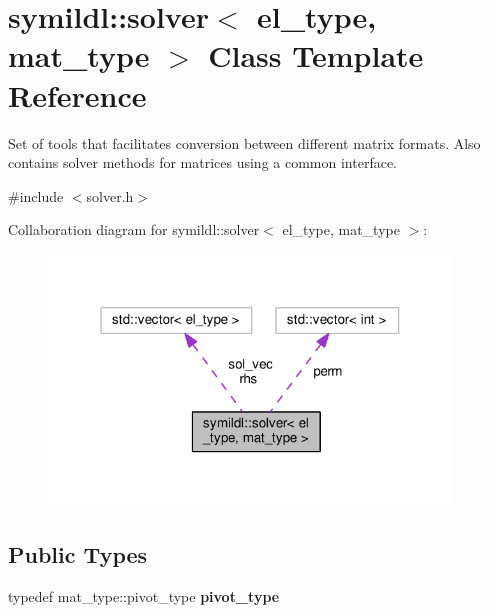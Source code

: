 \hypertarget{classsymildl_1_1solver}{}\section{symildl\+:\+:solver$<$ el\+\_\+type, mat\+\_\+type $>$ Class Template Reference}
\label{classsymildl_1_1solver}


Set of tools that facilitates conversion between different matrix formats. Also contains solver methods for matrices using a common interface.  




{\ttfamily \#include $<$solver.\+h$>$}



Collaboration diagram for symildl\+:\+:solver$<$ el\+\_\+type, mat\+\_\+type $>$\+:\nopagebreak
\begin{figure}[H]
\begin{center}
\leavevmode
\includegraphics[width=304pt]{classsymildl_1_1solver__coll__graph}
\end{center}
\end{figure}
\subsection*{Public Types}
\begin{DoxyCompactItemize}
\item 
typedef mat\+\_\+type\+::pivot\+\_\+type {\bfseries pivot\+\_\+type}\hypertarget{classsymildl_1_1solver_a70b6b2c8dd2ad3c158f9a94047c7b45e}{}\label{classsymildl_1_1solver_a70b6b2c8dd2ad3c158f9a94047c7b45e}

\end{DoxyCompactItemize}
